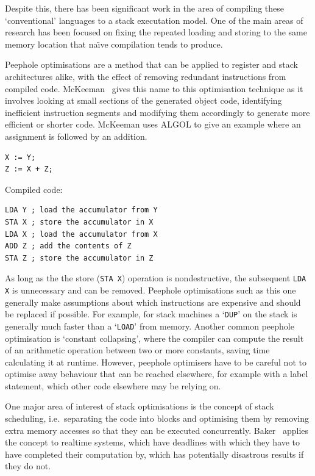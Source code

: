 Despite this, there has been significant work in the area of compiling these
`conventional' languages to a stack executation model. One of the main areas of
research has been focused on fixing the repeated loading and storing to the same
memory location that na{\"\i}ve compilation tends to produce.

Peephole optimisations are a method that can be applied to register and stack
architectures alike, with the effect of removing redundant instructions from
compiled code. McKeeman~\cite{McKeeman1965Peephole} gives this name to this
optimisation technique as it involves looking at small sections of the generated
object code, identifying inefficient instruction segments and modifying them
accordingly to generate more efficient or shorter code. McKeeman uses ALGOL to
give an example where an assignment is followed by an addition. \newline

\begin{minipage}{.25\textwidth}
  \centering
  \begin{lstlisting}[language=Algol]
X := Y;
Z := X + Z;
  \end{lstlisting}
\end{minipage}%
\begin{minipage}{.55\textwidth}
  Compiled code:
  \begin{lstlisting}
LDA Y ; load the accumulator from Y
STA X ; store the accumulator in X
LDA X ; load the accumulator from X
ADD Z ; add the contents of Z
STA Z ; store the accumulator in Z
  \end{lstlisting}
\end{minipage}

As long as the the store (\lstinline{STA X}) operation is nondestructive, the
subsequent \lstinline{LDA X} is unnecessary and can be removed. Peephole
optimisations such as this one generally make assumptions about which
instructions are expensive and should be replaced if possible. For example, for
stack machines a `\texttt{DUP}' on the stack is generally much faster than a
`\texttt{LOAD}' from memory. Another common peephole optimisation is `constant
collapsing', where the compiler can compute the result of an arithmetic
operation between two or more constants, saving time calculating it at runtime.
However, peephole optimisers have to be careful not to optimise away behaviour
that can be reached elsewhere, for example with a label statement, which other
code elsewhere may be relying on.

One major area of interest of stack optimisations is the concept of stack
scheduling, i.e.\ separating the code into blocks and optimising them by
removing extra memory accesses so that they can be executed concurrently.
Baker~\cite{Baker1991Stack} applies the concept to realtime systems, which have
deadlines with which they have to have completed their computation by, which has
potentially disastrous results if they do not.

